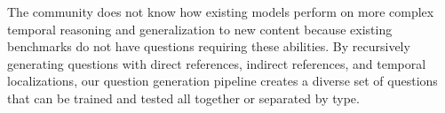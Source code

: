 \documentclass[10pt,twocolumn,letterpaper]{article}
\newcommand{\rak}[1]{{\color{red}{rak: #1}}}
\newcommand{\mgm}[1]{{\color{cyan}{mgm: #1}}}
\begin{document}
The community does not know how existing models perform on more complex temporal reasoning and generalization to new content because existing benchmarks do not have questions requiring these abilities. By recursively generating questions with direct references, indirect references, and temporal localizations, our question generation pipeline creates a diverse set of questions that can be trained and tested all together or separated by type.

\end{document}
